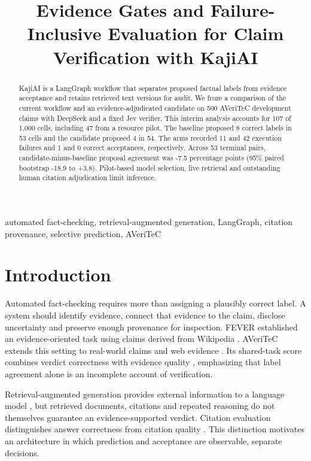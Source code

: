 \documentclass[conference]{IEEEtran}
\newcommand{\pct}{\%}
\begin{document}
\title{Evidence Gates and Failure-Inclusive Evaluation for Claim Verification with KajiAI}

\author{}
\maketitle

\begin{abstract}
KajiAI is a LangGraph workflow that separates proposed factual labels from evidence acceptance and retains retrieved text versions for audit. We froze a comparison of the current workflow and an evidence-adjudicated candidate on 500 AVeriTeC development claims with DeepSeek and a fixed Jev verifier. This interim analysis accounts for 107 of 1,000 cells, including 47 from a resource pilot. The baseline proposed 8 correct labels in 53 cells and the candidate proposed 4 in 54. The arms recorded 11 and 42 execution failures and 1 and 0 correct acceptances, respectively. Across 53 terminal pairs, candidate-minus-baseline proposal agreement was -7.5 percentage points (95\pct{} paired bootstrap -18.9 to +3.8). Pilot-based model selection, live retrieval and outstanding human citation adjudication limit inference.
\end{abstract}

\begin{IEEEkeywords}
automated fact-checking, retrieval-augmented generation, LangGraph, citation provenance, selective prediction, AVeriTeC
\end{IEEEkeywords}

\section{Introduction}
Automated fact-checking requires more than assigning a plausibly correct label. A system should identify evidence, connect that evidence to the claim, disclose uncertainty and preserve enough provenance for inspection. FEVER established an evidence-oriented task using claims derived from Wikipedia \cite{fever}. AVeriTeC extends this setting to real-world claims and web evidence \cite{averitec}. Its shared-task score combines verdict correctness with evidence quality \cite{sharedtask}, emphasizing that label agreement alone is an incomplete account of verification.

Retrieval-augmented generation provides external information to a language model \cite{rag}, but retrieved documents, citations and repeated reasoning do not themselves guarantee an evidence-supported verdict. Citation evaluation distinguishes answer correctness from citation quality \cite{alce}. This distinction motivates an architecture in which prediction and acceptance are observable, separate decisions.
\end{document}
